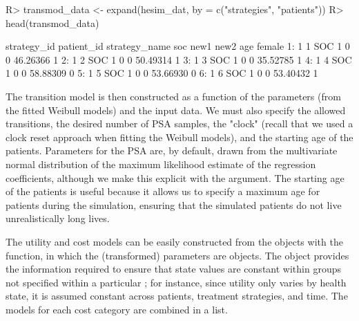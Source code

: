 \documentclass[article, nojss]{jss}\usepackage[]{graphicx}\usepackage[]{color}
\begin{document}
\begin{Schunk}
\begin{Sinput}
R> transmod_data <- expand(hesim_dat, by = c("strategies", "patients"))
R> head(transmod_data)
\end{Sinput}
\begin{Soutput}
   strategy_id patient_id strategy_name soc new1 new2      age female
1:           1          1           SOC   1    0    0 46.26366      1
2:           1          2           SOC   1    0    0 50.49314      1
3:           1          3           SOC   1    0    0 35.52785      1
4:           1          4           SOC   1    0    0 58.88309      0
5:           1          5           SOC   1    0    0 53.66930      0
6:           1          6           SOC   1    0    0 53.40432      1
\end{Soutput}
\end{Schunk}

The transition model is then constructed as a function of the parameters (from the fitted Weibull models) and the input data. We must also specify the allowed transitions, the desired number of PSA samples, the "clock" (recall that we used a clock reset approach when fitting the Weibull models), and the starting age of the patients. Parameters for the PSA are, by default, drawn from the multivariate normal distribution of the maximum likelihood estimate of the regression coefficients, although we make this explicit with the  argument. The starting age of the patients is useful because it allows us to specify a maximum age for patients during the simulation, ensuring that the simulated patients do not live unrealistically long lives. 

\begin{Schunk}
\end{Schunk}

The utility and cost models can be easily constructed from the  objects with the  function, in which the (transformed) parameters are  objects. The  object provides the information required to ensure that state values are constant within groups not specified within a particular ; for instance, since utility only varies by health state, it is assumed constant across patients, treatment strategies, and time. The models for each cost category are combined in a list.
  
\end{document}
